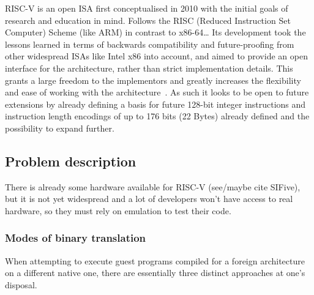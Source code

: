 RISC-V is an open ISA first conceptualised in 2010 with the initial goals of research and education in mind.
Follows the RISC (Reduced Instruction Set Computer) Scheme (like ARM) in contrast to x86-64\ldots
Its development took the lessons learned in terms of backwards compatibility and future-proofing from other widespread ISAs like Intel x86 into account, and aimed to provide an open interface for the architecture, rather than strict implementation details.
This grants a large freedom to the implementors and greatly increases the flexibility and ease of working with the architecture~\cite[S. 1f]{riscvspec}.
As such it looks to be open to future extensions by already defining a basis for future 128-bit integer instructions and instruction length encodings of up to 176 bits (22 Bytes) already defined and the possibility to expand further.


\subsection{Problem description}
There is already some hardware available for RISC-V (see/maybe cite SIFive), but it is not yet widespread and a lot of developers won't have access to real hardware, so they must rely on emulation to test their code.

\subsubsection{Modes of binary translation}

When attempting to execute guest programs compiled for a foreign architecture on a different native one, there are essentially three distinct approaches at one's disposal.

